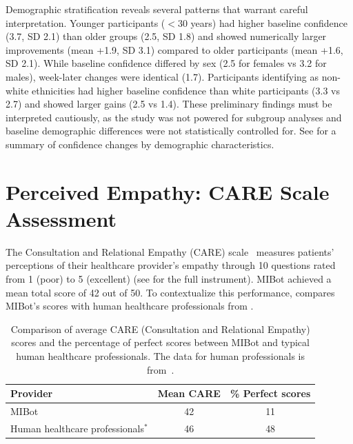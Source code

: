 Demographic stratification reveals several patterns that warrant careful interpretation. Younger participants ($<30$ years) had higher baseline confidence (3.7, SD 2.1) than older groups (2.5, SD 1.8) and showed numerically larger improvements (mean +1.9, SD 3.1) compared to older participants (mean +1.6, SD 2.1). While baseline confidence differed by sex (2.5 for females vs 3.2 for males), week-later changes were identical (1.7). Participants identifying as non-white ethnicities had higher baseline confidence than white participants (3.3 vs 2.7) and showed larger gains (2.5 vs 1.4). These preliminary findings must be interpreted cautiously, as the study was not powered for subgroup analyses and baseline demographic differences were not statistically controlled for. See  for a summary of confidence changes by demographic characteristics.


\section{Perceived Empathy: CARE Scale Assessment}
\label{sec:perceived-empathy}

The Consultation and Relational Empathy (CARE) scale~\citep{10.1093/fampra/cmh621} measures patients' perceptions of their healthcare provider's empathy through 10 questions rated from 1 (poor) to 5 (excellent) (see  for the full instrument). MIBot achieved a mean total score of 42 out of 50. To contextualize this performance,  compares MIBot's scores with human healthcare professionals from \citet{Bikker2015}.

\begin{table}[ht]
	\centering
	\small
	\setlength{\tabcolsep}{4pt}
	\renewcommand{\arraystretch}{1.1}
	\begin{tabular}{@{}lcc@{}}
		\toprule
		\textbf{Provider}                  & \textbf{Mean CARE} & \textbf{\% Perfect scores} \\
		\midrule
		MIBot                              & 42                 & 11                         \\
		Human healthcare professionals$^*$ & 46                 & 48                         \\
		\bottomrule
	\end{tabular}
	\caption[MIBot vs. Human CARE Scores]{Comparison of average CARE (Consultation and Relational Empathy) scores and the percentage of perfect scores between MIBot and typical human healthcare professionals. The data for human professionals is from~\cite{Bikker2015}.}
	\label{table:care_comparison}
\end{table}

